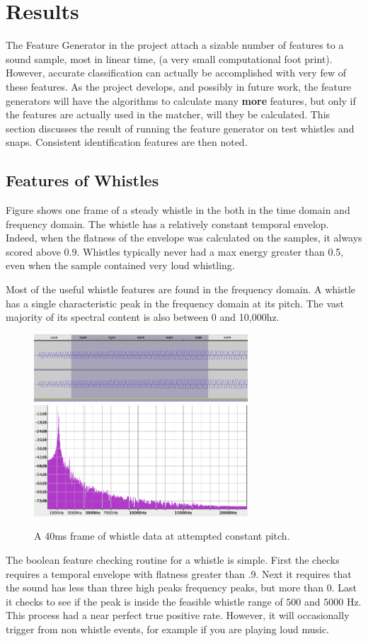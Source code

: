 \documentclass[DIV=calc, paper=a4, fontsize=11pt, twocolumn]{scrartcl}   %
\begin{document}
\section{Results}
   The Feature Generator in the project attach a sizable number of features to a sound sample, most in linear time,  (a very small computational foot print). However, accurate classification can actually be accomplished with very few of these features. As the project develops, and possibly in future work, the feature generators will have the algorithms to calculate many \textbf{more} features, but only if the features are actually used in the matcher, will they be calculated. This section discusses the result of running the feature generator on test whistles and snaps. Consistent identification features are then noted.
   \subsection{Features of Whistles}

   Figure  shows one frame of a steady whistle in the both in the time domain and frequency domain. The whistle has a relatively constant temporal envelop. Indeed, when the flatness of the envelope was calculated on the samples, it always scored above 0.9. Whistles typically never had a max energy greater than 0.5, even when the sample contained very loud whistling.
   \par Most of the useful whistle features are found in the frequency domain. A whistle has a single characteristic peak in the frequency domain at its pitch. The vast majority of its spectral content is also between 0 and 10,000hz.


   \begin{figure}[h]
   \centering
   \includegraphics[width=80mm]{figures/whistle_frame_t.png}
   \includegraphics[width=80mm]{figures/whistle_frame_f.png}
   \caption{A 40ms frame of whistle data at attempted constant pitch.}
   \label{overflow}
   \end{figure}
   \par The boolean feature checking routine for a whistle is simple. First the checks requires a temporal envelope with flatness greater than .9. Next it requires that the sound has less than three high peaks frequency peaks, but more than 0. Last it checks to see if the peak is inside the feasible whistle range of $500$ and $5000$ Hz. This process had a near perfect true positive rate. However, it will occasionally trigger from non whistle events, for example if you are playing loud music.
\end{document}
